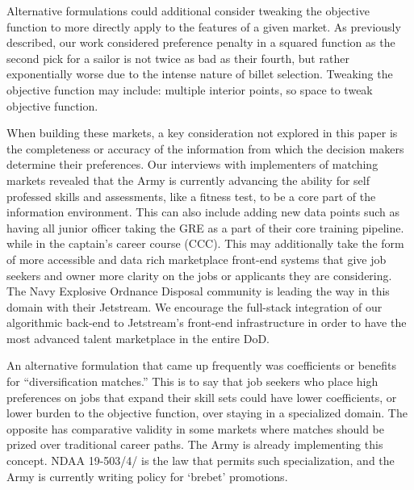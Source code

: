 Alternative formulations could additional consider tweaking the objective function to more directly apply to the features of a given market. As previously described, our work considered preference penalty in a squared function as the second pick for a sailor is not twice as bad as their fourth, but rather exponentially worse due to the intense nature of billet selection. Tweaking the objective function may include: multiple interior points, so space to tweak objective function.  \citep{1988_Roth_Sotomayor}

When building these markets, a key consideration not explored in this paper is the completeness or accuracy of the information from which the decision makers determine their preferences. Our interviews with implementers of matching markets revealed that the Army is currently advancing the ability for self professed skills and assessments, like a fitness test, to be a core part of the information environment. This can also include adding new data points such as having all junior officer taking the GRE as a part of their core training pipeline. while in the captain’s career course (CCC). This may additionally take the form of more accessible and data rich marketplace front-end systems that give job seekers and owner more clarity on the jobs or applicants they are considering. The Navy Explosive Ordnance Disposal community is leading the way in this domain with their Jetstream. We encourage the full-stack integration of our algorithmic back-end to Jetstream’s front-end infrastructure in order to have the most advanced talent marketplace in the entire DoD. 

An alternative formulation that came up frequently was coefficients or benefits for “diversification matches.” This is to say that job seekers who place high preferences on jobs that expand their skill sets could have lower coefficients, or lower burden to the objective function, over staying in a specialized domain. The opposite has comparative validity in some markets where matches should be prized over traditional career paths. The Army is already implementing this concept. NDAA 19-503/4/ is the law that permits such specialization, and the Army is currently writing policy for ‘brebet’ promotions. 
